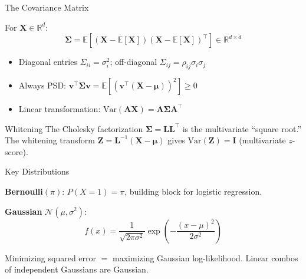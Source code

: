 \documentclass[aspectratio=169, professionalfonts]{beamer}
\def\R{\mathbb{R}}
\def\E{\mathbb{E}}
\def\Var{\text{Var}}
\begin{document}
\begin{frame}{The Covariance Matrix}

For $\mathbf{X} \in \R^d$:
$$\bm{\Sigma} = \E[(\mathbf{X} - \E[\mathbf{X}])(\mathbf{X} - \E[\mathbf{X}])^\top] \in \R^{d \times d}$$

\begin{itemize}
  \item Diagonal entries $\Sigma_{ii} = \sigma_i^2$; off-diagonal $\Sigma_{ij} = \rho_{ij}\sigma_i\sigma_j$
  \item Always PSD: $\mathbf{v}^\top\bm{\Sigma}\mathbf{v} = \E[(\mathbf{v}^\top(\mathbf{X} - \bm{\mu}))^2] \geq 0$
  \item Linear transformation: $\Var(\mathbf{A}\mathbf{X}) = \mathbf{A}\bm{\Sigma}\mathbf{A}^\top$
\end{itemize}

\bigskip

\begin{block}{Whitening}
The Cholesky factorization $\bm{\Sigma} = \mathbf{L}\mathbf{L}^\top$ is the multivariate ``square root.'' The whitening transform $\mathbf{Z} = \mathbf{L}^{-1}(\mathbf{X} - \bm{\mu})$ gives $\Var(\mathbf{Z}) = \mathbf{I}$ (multivariate $z$-score).
\end{block}

\end{frame}

\begin{frame}{Key Distributions}

\textbf{Bernoulli}$(\pi)$: $P(X\!=\!1) = \pi$, building block for logistic regression.

\bigskip

\textbf{Gaussian} $\mathcal{N}(\mu, \sigma^2)$:
$$f(x) = \frac{1}{\sqrt{2\pi\sigma^2}}\exp\!\left(-\frac{(x - \mu)^2}{2\sigma^2}\right)$$

\begin{center}
\end{center}

Minimizing squared error $=$ maximizing Gaussian log-likelihood. Linear combos of independent Gaussians are Gaussian.

\end{frame}
\end{document}
